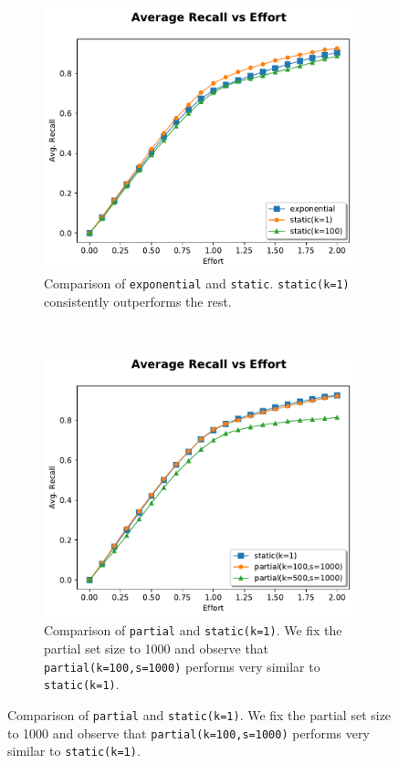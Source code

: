 \begin{figure}
    \centering
    \begin{subfigure}[t]{0.48\textwidth}
        \centering
        \includegraphics[width=\textwidth]{plots/bmi_static.pdf}
        \caption{Comparison of \texttt{exponential} and \texttt{static}.
            \texttt{static(k=1)} consistently outperforms the rest.}
        \label{plot:bmi_static}
    \end{subfigure}
    ~
    \begin{subfigure}[t]{0.48\textwidth}
        \centering
        \includegraphics[width=\textwidth]{plots/static_partial.pdf}
        \caption{Comparison of \texttt{partial} and \texttt{static(k=1)}. We fix
            the partial set size to 1000 and observe that
            \texttt{partial(k=100,s=1000)} performs very similar to
        \texttt{static(k=1)}.}
        \label{plot:partial1}
    \end{subfigure}


\end{figure}
